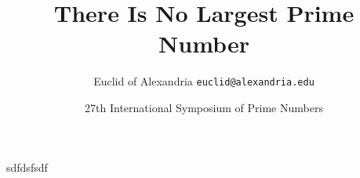 \documentclass{beamer}
\title{There Is No Largest Prime Number}
\date[ISPN ’80]{27th International Symposium of Prime Numbers}
\author[Euclid]{Euclid of Alexandria \texttt{euclid@alexandria.edu}}
\begin{document}
\begin{frame}
\titlepage
\end{frame}

\begin{frame}
sdfdsfsdf
\end{frame}
\end{document}
